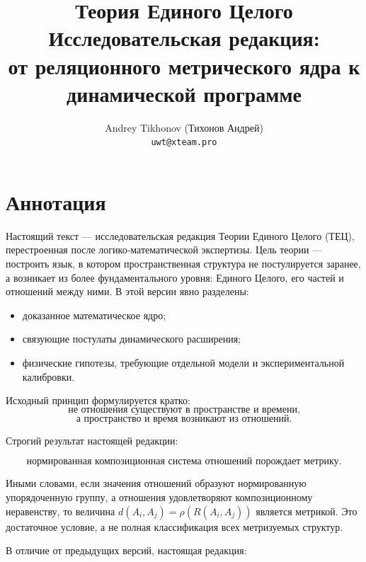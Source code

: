 \documentclass[12pt,a4paper,oneside]{book}
\title{\Huge\textbf{Теория Единого Целого}\\[0.8em]
\Large Исследовательская редакция:\\
от реляционного метрического ядра к динамической программе}
\author{Andrey Tikhonov (Тихонов Андрей)\\\texttt{uwt@xteam.pro}}
\date{}
\theoremstyle{definition}
\theoremstyle{plain}
\theoremstyle{remark}
\newcommand{\Rel}{R}
\newcommand{\norm}{\rho}
\begin{document}
\frontmatter
\maketitle

\chapter*{Аннотация}

Настоящий текст --- исследовательская редакция Теории Единого Целого (ТЕЦ),
перестроенная после логико-математической экспертизы. Цель теории --- построить
язык, в котором пространственная структура не постулируется заранее, а возникает
из более фундаментального уровня: Единого Целого, его частей и отношений между
ними. В этой версии явно разделены:

\begin{itemize}
    \item доказанное математическое ядро;
    \item связующие постулаты динамического расширения;
    \item физические гипотезы, требующие отдельной модели и экспериментальной
    калибровки.
\end{itemize}

Исходный принцип формулируется кратко:
\[
\boxed{\text{не отношения существуют в пространстве и времени,}}
\]
\[
\boxed{\text{а пространство и время возникают из отношений.}}
\]

Строгий результат настоящей редакции:

\[
\boxed{\text{нормированная композиционная система отношений порождает метрику.}}
\]

Иными словами, если значения отношений образуют нормированную упорядоченную группу,
а отношения удовлетворяют композиционному неравенству, то величина
$d(A_i,A_j)=\norm(\Rel(A_i,A_j))$ является метрикой. Это достаточное условие, а не
полная классификация всех метризуемых структур.

В отличие от предыдущих версий, настоящая редакция:
\end{document}
